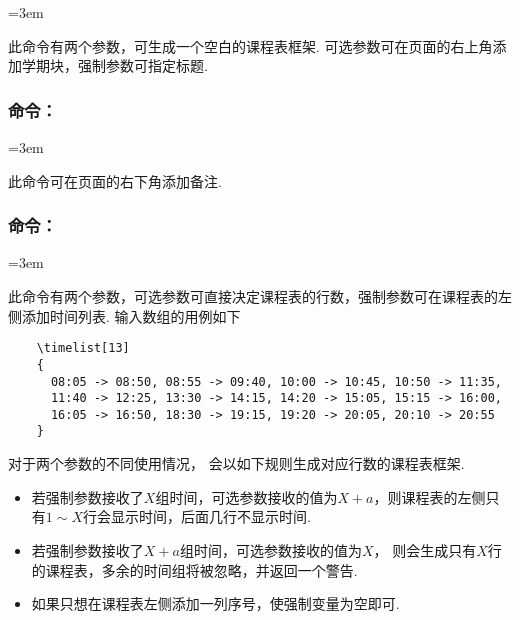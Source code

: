 \documentclass[letterpaper]{l3doc}
\newenvironment{example}{\begin{list}{}{\leftmargin=3em}\item }{\end{list}}
\begin{document}
\begin{example}
    \qquad
\end{example}

此命令有两个参数，可生成一个空白的课程表框架. 可选参数可在页面的右上角添加学期块，强制参数可指定标题.

\subsubsection{命令：}

\begin{example}
\end{example}

此命令可在页面的右下角添加备注.

\subsubsection{命令：}

\begin{example}
    \qquad
\end{example}

此命令有两个参数，可选参数可直接决定课程表的行数，强制参数可在课程表的左侧添加时间列表. 输入数组的用例如下

\begin{Verbatim}
    \timelist[13]
    {
      08:05 -> 08:50, 08:55 -> 09:40, 10:00 -> 10:45, 10:50 -> 11:35,
      11:40 -> 12:25, 13:30 -> 14:15, 14:20 -> 15:05, 15:15 -> 16:00,
      16:05 -> 16:50, 18:30 -> 19:15, 19:20 -> 20:05, 20:10 -> 20:55
    }
\end{Verbatim}

对于两个参数的不同使用情况， 会以如下规则生成对应行数的课程表框架.

\begin{itemize}
    \item 若强制参数接收了$X$组时间，可选参数接收的值为$X+a$，则课程表的左侧只有$1 \sim X$行会显示时间，后面几行不显示时间.
    \item 若强制参数接收了$X+a$组时间，可选参数接收的值为$X$， 则会生成只有$X$行的课程表，多余的时间组将被忽略，并返回一个警告.
    \item 如果只想在课程表左侧添加一列序号，使强制变量为空即可.
\end{itemize}
\end{document}
